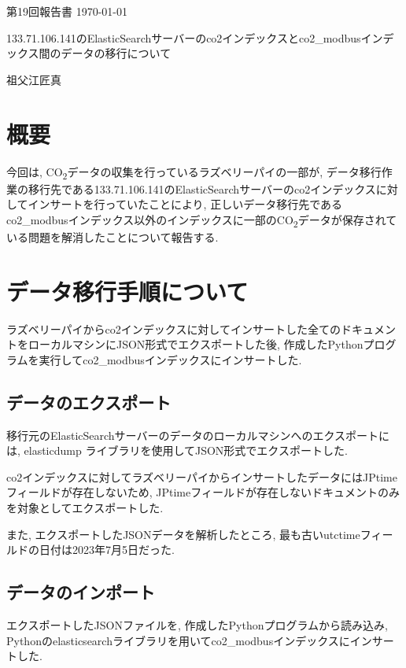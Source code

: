 \documentclass[a4j,12pt,]{jarticle}
\begin{document}
{\noindent\small 第19回報告書 \hfill\today}
\begin{center}
  {\Large 133.71.106.141のElasticSearchサーバーのco2インデックスとco2\_modbusインデックス間のデータの移行について}
\end{center}
\begin{flushright}
  祖父江匠真 \\
\end{flushright}

\section{概要}
今回は, CO\textsubscript{2}データの収集を行っているラズベリーパイの一部が, データ移行作業の移行先である133.71.106.141のElasticSearchサーバーのco2インデックスに対してインサートを行っていたことにより, 正しいデータ移行先であるco2\_modbusインデックス以外のインデックスに一部のCO\textsubscript{2}データが保存されている問題を解消したことについて報告する.

\section{データ移行手順について}

ラズベリーパイからco2インデックスに対してインサートした全てのドキュメントをローカルマシンにJSON形式でエクスポートした後, 作成したPythonプログラムを実行してco2\_modbusインデックスにインサートした.

\subsection{データのエクスポート}
移行元のElasticSearchサーバーのデータのローカルマシンへのエクスポートには, elasticdump \cite{1}ライブラリを使用してJSON形式でエクスポートした.

co2インデックスに対してラズベリーパイからインサートしたデータにはJPtimeフィールドが存在しないため, JPtimeフィールドが存在しないドキュメントのみを対象としてエクスポートした.

また, エクスポートしたJSONデータを解析したところ, 最も古いutctimeフィールドの日付は2023年7月5日だった.

\subsection{データのインポート}
エクスポートしたJSONファイルを, 作成したPythonプログラムから読み込み, Pythonのelasticsearchライブラリを用いてco2\_modbusインデックスにインサートした.
\end{document}

